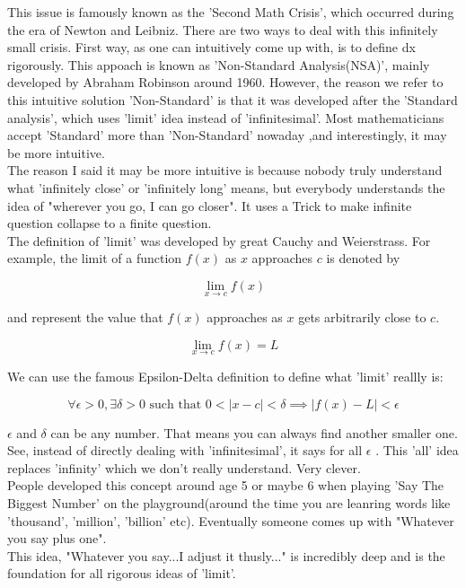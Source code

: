 \documentclass{article}
\begin{document}
  This issue is famously known as the 'Second Math Crisis', which occurred during the era of Newton and Leibniz. There are two ways to deal with this infinitely small crisis. First way, as one can intuitively come up with, is to define dx rigorously. This appoach is known as 'Non-Standard Analysis(NSA)', mainly developed by Abraham Robinson around 1960. However, the reason we refer to this intuitive solution 'Non-Standard' is that it was developed after the 'Standard analysis', which uses 'limit' idea instead of 'infinitesimal'. Most mathematicians accept 'Standard' more than 'Non-Standard' nowaday ,and interestingly, it may be more intuitive. \\

  The reason I said it may be more intuitive is because nobody truly understand what 'infinitely close' or 'infinitely long' means, but everybody understands the idea of "wherever you go, I can go closer". It uses a Trick to make infinite question collapse to a finite question. \\

  The definition of 'limit' was developed by great Cauchy and Weierstrass. For example, the limit of a function $f(x)$ as $x$ approaches $c$ is denoted by 

  \[
	  \lim_{x \to c} f(x)
  \] 

  and represent the value that $f(x)$ approaches as $x$ gets arbitrarily close to $c$. 

  \[\lim_{x \to c} f(x) = L\]

  We can use the famous Epsilon-Delta definition to define what 'limit' reallly is:

  \[\forall \epsilon > 0, \exists \delta > 0 \text { such that } 0 < |x -c| < \delta \implies |f(x) - L| < \epsilon\]

  $\epsilon$ and $\delta$ can be any number. That means you can always find another smaller one. See, instead of directly dealing with 'infinitesimal', it says for all $\epsilon$ . This 'all' idea replaces 'infinity' which we don't really understand. Very clever. \\

  People developed this concept around age 5 or maybe 6 when playing 'Say The Biggest Number' on the playground(around the time you are leanring words like 'thousand', 'million', 'billion' etc). Eventually someone comes up with "Whatever you say plus one". \\

  This idea, "Whatever you say...I adjust it thusly..." is incredibly deep and is the foundation for all rigorous ideas of 'limit'.  \\
\end{document}
